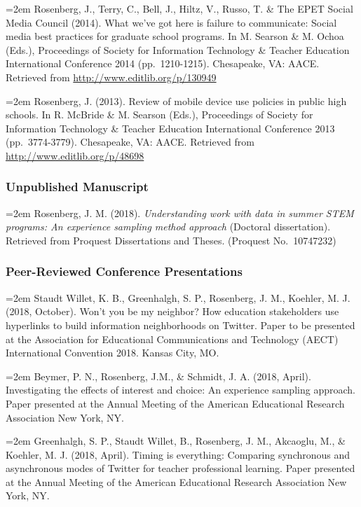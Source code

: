 \documentclass[]{article}
\begin{document}
\hangindent=2em Rosenberg, J., Terry, C., Bell, J., Hiltz, V., Russo, T.
\& The EPET Social Media Council (2014). What we've got here is failure
to communicate: Social media best practices for graduate school
programs. In M. Searson \& M. Ochoa (Eds.), Proceedings of Society for
Information Technology \& Teacher Education International Conference
2014 (pp.~1210-1215). Chesapeake, VA: AACE. Retrieved from
\url{http://www.editlib.org/p/130949}

\hangindent=2em Rosenberg, J. (2013). Review of mobile device use
policies in public high schools. In R. McBride \& M. Searson (Eds.),
Proceedings of Society for Information Technology \& Teacher Education
International Conference 2013 (pp.~3774-3779). Chesapeake, VA: AACE.
Retrieved from \url{http://www.editlib.org/p/48698}

\hypertarget{unpublished-manuscript}{%
\subsubsection{Unpublished Manuscript}\label{unpublished-manuscript}}

\hangindent=2em Rosenberg, J. M. (2018). \emph{Understanding work with
data in summer STEM programs: An experience sampling method approach}
(Doctoral dissertation). Retrieved from Proquest Dissertations and
Theses. (Proquest No.~10747232)

\hypertarget{peer-reviewed-conference-presentations}{%
\subsubsection{Peer-Reviewed Conference
Presentations}\label{peer-reviewed-conference-presentations}}

\hangindent=2em Staudt Willet, K. B., Greenhalgh, S. P., Rosenberg, J.
M., Koehler, M. J. (2018, October). Won't you be my neighbor? How
education stakeholders use hyperlinks to build information neighborhoods
on Twitter. Paper to be presented at the Association for Educational
Communications and Technology (AECT) International Convention 2018.
Kansas City, MO.

\hangindent=2em Beymer, P. N., Rosenberg, J.M., \& Schmidt, J. A. (2018,
April). Investigating the effects of interest and choice: An experience
sampling approach. Paper presented at the Annual Meeting of the American
Educational Research Association New York, NY.

\hangindent=2em Greenhalgh, S. P., Staudt Willet, B., Rosenberg, J. M.,
Akcaoglu, M., \& Koehler, M. J. (2018, April). Timing is everything:
Comparing synchronous and asynchronous modes of Twitter for teacher
professional learning. Paper presented at the Annual Meeting of the
American Educational Research Association New York, NY.
\end{document}
